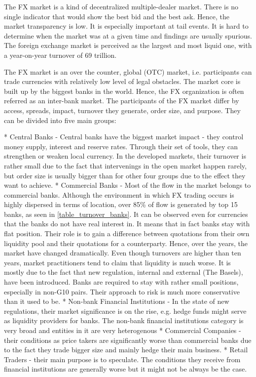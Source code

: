\documentclass{article}\usepackage[]{graphicx}\usepackage[]{color}
\begin{document}
The FX market is a kind of decentralized multiple-dealer market. There is no single indicator that would show the best bid and the best ask. Hence, the market transparency is low. It is especially important at tail events. It is hard to determine when the market was at a given time and findings are usually spurious.
The foreign exchange market is perceived as the largest and most liquid one, with a year-on-year turnover of 69 trillion.




The FX market is an over the counter, global (OTC) market, i.e. participants can trade currencies with relatively low level of legal obstacles. The market core is built up by the biggest banks in the world. Hence, the FX organization is often referred as
an inter-bank market.
The participants of the FX market differ by access, spreads, impact, turnover they generate, order size, and purpose. They can be divided into five main groups:

* Central Banks - Central banks have the biggest market impact - they control money supply, interest and reserve rates. Through their set of tools, they can strengthen or weaken local currency. In the developed markets, their turnover is rather small due to the fact that intervenings
in the open market happen rarely, but order size is usually bigger than for other four groups due to the effect they want to achieve.
* Commercial Banks - Most of the flow in the market belongs to commercial banks. Although the environment in which FX trading occurs is highly dispersed in terms of location, over 85\% of flow is generated by top 15 banks, as seen in \ref{table_turnover_banks}. It can be observed even for currencies that the banks do not have real interest in. It means that in fact banks stay with flat position.
Their role is to gain a difference between quotations from their own liquidity pool and their quotations for a counterparty.
Hence, over the years, the market have changed dramatically. Even though turnovers are higher than ten years, market practitioners tend to claim that liquidity is much worse. It is mostly due to the fact that new regulation, internal and external (The Basels), have been introduced.
Banks are required to stay with rather small positions, especially in non-G10 pairs. Their approach to risk is much more conservative than it used to be.
* Non-bank Financial Institutions - In the state of new regulations, their market significance is on the rise, e.g. hedge funds might serve as liquidity providers for banks. The non-bank financial institutions category is very broad and entities in it are very heterogenous
* Commercial Companies - their conditions as price takers are significantly worse than commercial banks due to the fact they trade bigger size and mainly hedge their main business.
* Retail Traders - their main purpose is to speculate. The conditions they receive from financial institutions are generally worse but it might not be always be the case.
\end{document}
